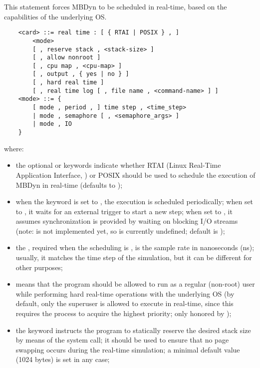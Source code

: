 \noindent
This statement forces MBDyn to be scheduled in real-time,
based on the capabilities of the underlying OS.
\begin{verbatim}
    <card> ::= real time : [ { RTAI | POSIX } , ]
        <mode>
        [ , reserve stack , <stack-size> ]
        [ , allow nonroot ]
        [ , cpu map , <cpu-map> ]
        [ , output , { yes | no } ]
        [ , hard real time ]
        [ , real time log [ , file name , <command-name> ] ]
    <mode> ::= {
        [ mode , period , ] time step , <time_step>
        | mode , semaphore [ , <semaphore_args> ]
        | mode , IO
    }
\end{verbatim}
where:
\begin{itemize}
\item the optional  or  keywords indicate whether
RTAI (Linux Real-Time Application Interface, )
or POSIX should be used to schedule the execution of MBDyn in real-time
(defaults to );

\item when the keyword  is set to , the execution
is scheduled periodically; when set to , it waits 
for an external trigger to start a new step;
when set to , it assumes synchronization is provided
by waiting on blocking I/O streams
(note:  is not implemented yet,
so  
is currently undefined; default is );

\item the , required when the scheduling is ,
is the sample rate in nanoseconds (ns); 
usually, it matches the time step of the simulation,
but it can be different for other purposes;

\item {} means that the program should be allowed to run
as a regular (non-root) user while performing hard real-time operations
with the underlying OS (by default, only the superuser is allowed
to execute in real-time, since this requires the process to acquire
the highest priority; only honored by );

\item the keyword  instructs the program 
to statically reserve the desired stack size by means 
of the  system call; it should be used to ensure 
that no page swapping occurs during the real-time simulation;
a minimal default value (1024 bytes) is set in any case;


\end{itemize}
